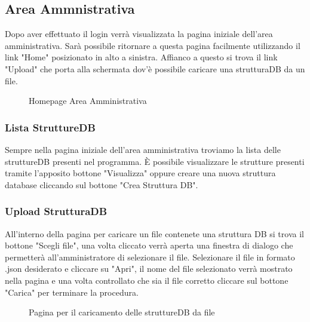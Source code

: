 \documentclass[5pt]{article}
\begin{document}
	    \subsection{Area Ammnistrativa}
	    Dopo aver effettuato il login verrà visualizzata la pagina iniziale dell'area amministrativa. Sarà possibile ritornare a questa pagina facilmente utilizzando il link "Home" posizionato in alto a sinistra. Affianco a questo si trova il link "Upload" che porta alla schermata dov'è possibile caricare una strutturaDB da un file.
	    \begin{figure}[ht]
	    	\centering
	    	\caption{Homepage Area Amministrativa}
	    \end{figure}
	    
	    \subsubsection{Lista StruttureDB}
	    Sempre nella pagina iniziale dell'area amministrativa troviamo la lista delle struttureDB presenti nel programma. È possibile visualizzare le strutture presenti tramite l'apposito bottone "Visualizza" oppure creare una nuova struttura database cliccando sul bottone "Crea Struttura DB". 
	    
	    \subsubsection{Upload StrutturaDB}
	    All'interno della pagina per caricare un file contenete una struttura DB si trova il bottone "Scegli file", una volta cliccato verrà aperta una finestra di dialogo che permetterà all'amministratore di selezionare il file. Selezionare il file in formato .json desiderato e cliccare su "Apri", il nome del file selezionato verrà mostrato nella pagina e una volta controllato che sia il file corretto cliccare sul bottone "Carica" per terminare la procedura.
	    \begin{figure}[ht]
	    	\centering
	    	\caption{Pagina per il caricamento delle struttureDB da file}
	    \end{figure}
	    
\end{document}
